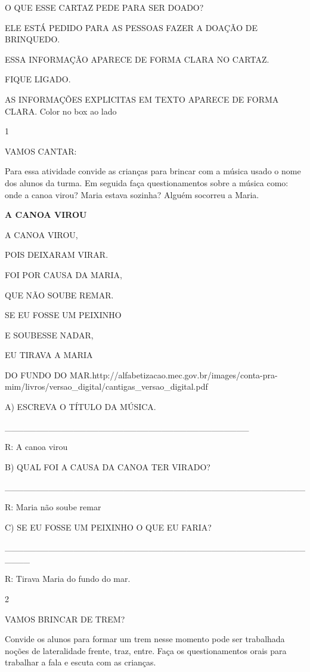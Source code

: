 {{O QUE ESSE CARTAZ PEDE PARA SER DOADO?

ELE ESTÁ PEDIDO PARA AS PESSOAS FAZER A DOAÇÃO DE BRINQUEDO.

ESSA INFORMAÇÃO APARECE DE FORMA CLARA NO CARTAZ.

FIQUE LIGADO.

AS INFORMAÇÕES EXPLICITAS EM TEXTO APARECE DE FORMA CLARA. Color no box
ao lado


\num{1}

VAMOS CANTAR:

Para essa atividade convide as crianças para brincar com a música usado
o nome dos alunos da turma. Em seguida faça questionamentos sobre a
música como: onde a canoa virou? Maria estava sozinha? Alguém socorreu a
Maria.

\textbf{A CANOA VIROU}

A CANOA VIROU,

POIS DEIXARAM VIRAR.

FOI POR CAUSA DA MARIA,

QUE NÃO SOUBE REMAR.

SE EU FOSSE UM PEIXINHO

E SOUBESSE NADAR,

EU TIRAVA A MARIA

DO FUNDO DO
MAR.http://alfabetizacao.mec.gov.br/images/conta-pra-mim/livros/versao\_digital/cantigas\_versao\_digital.pdf

A) ESCREVA O TÍTULO DA MÚSICA.

\_\_\_\_\_\_\_\_\_\_\_\_\_\_\_\_\_\_\_\_\_\_\_\_\_\_\_\_\_\_\_\_\_\_\_\_\_\_\_

R: A canoa virou

B) QUAL FOI A CAUSA DA CANOA TER VIRADO?

\_\_\_\_\_\_\_\_\_\_\_\_\_\_\_\_\_\_\_\_\_\_\_\_\_\_\_\_\_\_\_\_\_\_\_\_\_\_\_\_\_\_\_\_\_\_\_\_

R: Maria não soube remar

C) SE EU FOSSE UM PEIXINHO O QUE EU FARIA?

\_\_\_\_\_\_\_\_\_\_\_\_\_\_\_\_\_\_\_\_\_\_\_\_\_\_\_\_\_\_\_\_\_\_\_\_\_\_\_\_\_\_\_\_\_\_\_\_\_\_\_\_

R: Tirava Maria do fundo do mar.

\num{2}

VAMOS BRINCAR DE TREM?

Convide os alunos para formar um trem nesse momento pode ser trabalhada
noções de lateralidade frente, traz, entre. Faça os questionamentos
orais para trabalhar a fala e escuta com as crianças.

}}
